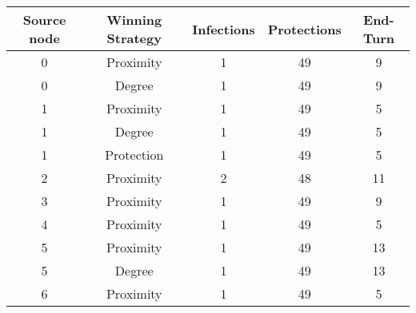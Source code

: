 \documentclass[results.tex]{subfiles}
\begin{document}
    \begin{center}
        \begin{tabular}{| c || c | c | c | c |}
            \hline
            {\bfseries Source node} & {\bfseries Winning Strategy} & {\bfseries Infections} & {\bfseries Protections}
            & {\bfseries End-Turn}
            \\  %
            \hline\hline
            0                       & Proximity                    & 1                      & 49                      & 9                    \\
            \hline
            0                       & Degree                       & 1                      & 49                      & 9                    \\
            \hline
            1                       & Proximity                    & 1                      & 49                      & 5                    \\
            \hline
            1                       & Degree                       & 1                      & 49                      & 5                    \\
            \hline
            1                       & Protection                   & 1                      & 49                      & 5                    \\
            \hline
            2                       & Proximity                    & 2                      & 48                      & 11                   \\
            \hline
            3                       & Proximity                    & 1                      & 49                      & 9                    \\
            \hline
            4                       & Proximity                    & 1                      & 49                      & 5                    \\
            \hline
            5                       & Proximity                    & 1                      & 49                      & 13                   \\
            \hline
            5                       & Degree                       & 1                      & 49                      & 13                   \\
            \hline
            6                       & Proximity                    & 1                      & 49                      & 5                    \\

\end{tabular}
\end{center}
\end{document}

